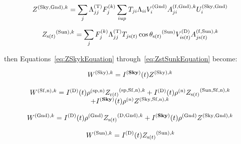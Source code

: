 \begin{equation}
{Z^{{\rm{(Sky, Gnd)}},k}} = \sum\limits_j {\Lambda_{jj}^{{\rm{(T)}}}F_j^{{\rm{(}}k{\rm{)}}}\sum\limits_{i{\rm{ }}up} {{T_{ji}}{\Lambda_{ii}}V_i^{{\rm{(Gnd)}}}A_{ji}^{{\rm{(f, Gnd), }}k}U_i^{{\rm{(Sky, Gnd)}}}} }
\end{equation}

\begin{equation}
{Z_{{\rm{s(}}t{\rm{)}}}}^{{\rm{(Sun)}},k} = \sum\limits_j {F_j^{{\rm{(}}k{\rm{)}}}\Lambda_{jj}^{{\rm{(T)}}}{T_{j{\rm{ s}}(t)}}\cos {\theta_{{\rm{s(}}t{\rm{)}}}}^{{\rm{(Sun)}}}V_{i{\rm{ s(}}t{\rm{)}}}^{{\rm{(D)}}}A_{j{\rm{ s(}}t{\rm{)}}}^{{\rm{(f, Sun), }}k}}
\label{eq:ZstSunkEquation}
\end{equation}

then Equations~\ref{eq:ZSkykEquation} through~\ref{eq:ZstSunkEquation} become:

\begin{equation}
{W^{{\rm{(Sky), }}k}} = {I^{({\bf{Sky}})}}(t){Z^{{\rm{(Sky), }}k}}
\label{eq:WSkykEquation}
\end{equation}

\begin{equation}
\begin{array}{c}{W^{{\rm{(Sf,n)}},k}} = {I^{{\rm{(D)}}}}(t){\rho ^{{\rm{(sp, n)}}}}{Z_{{\rm{r(}}t{\rm{)}}}}^{{\rm{(sp, Sf, n)}},k} + {I^{{\rm{(D)}}}}(t){\rho ^{{\rm{(n)}}}}{Z_{{\rm{s(}}t{\rm{)}}}}^{{\rm{(Sun, Sf, n)}},k}\\ + {I^{({\bf{Sky}})}}(t){\rho ^{{\rm{(n)}}}}{Z^{{\rm{(Sky, Sf, n)}},k}}\end{array}
\end{equation}

\begin{equation}
{W^{{\rm{(Gnd)}},k}} = {I^{{\rm{(D)}}}}(t){\rho ^{{\rm{(Gnd)}}}}{Z_{{\rm{s(}}t{\rm{)}}}}^{{\rm{(D, Gnd)}},k} + {I^{({\bf{Sky}})}}(t){\rho ^{{\rm{(Gnd)}}}}{Z^{{\rm{(Sky, Gnd)}},k}}
\end{equation}

\begin{equation}
{W^{{\rm{(Sun)}},k}} = {I^{{\rm{(D)}}}}(t){Z_{{\rm{s(}}t{\rm{)}}}}^{{\rm{(Sun)}},k}
\label{eq:WSunkEquation}
\end{equation}

